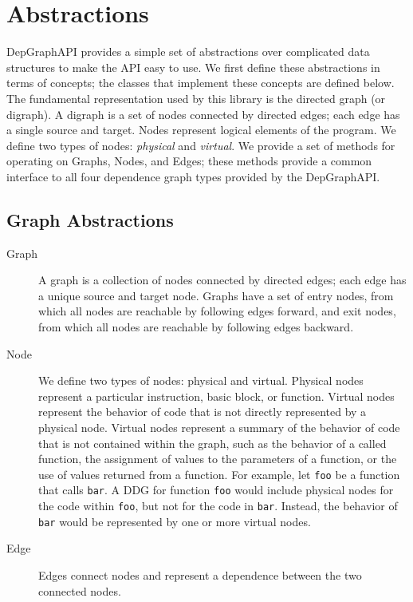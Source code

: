 \documentclass[12pt,titlepage]{article}
\begin{document}
\section{Abstractions}

DepGraphAPI provides a simple set of abstractions over complicated
data structures to make the API easy to use. We first define these
abstractions in terms of concepts; the classes that implement these
concepts are defined below. The fundamental representation used by
this library is the directed graph (or digraph). A digraph is a set of
nodes connected by directed edges; each edge has a single source and
target. Nodes represent logical elements of the program. We define two
types of nodes: \emph{physical} and \emph{virtual}.  We provide a set
of methods for operating on Graphs, Nodes, and Edges; these methods
provide a common interface to all four dependence graph types provided
by the DepGraphAPI.

\subsection{Graph Abstractions}
\begin{description}
\item[Graph] A graph is a collection of nodes connected by directed
  edges; each edge has a unique source and target node. Graphs have a
  set of entry nodes, from which all nodes are reachable by following
  edges forward, and exit nodes, from which all nodes are reachable by
  following edges backward.
\item[Node] We define two types of nodes: physical and
  virtual. Physical nodes represent a particular instruction, basic
  block, or function. Virtual nodes represent the behavior of code
  that is not directly represented by a physical node. Virtual nodes
  represent a summary of the behavior of code that is not contained
  within the graph, such as the behavior of a called function, the
  assignment of values to the parameters of a function, or the use of
  values returned from a function. For example, let \texttt{foo} be a
  function that calls \texttt{bar}. A DDG for function \texttt{foo}
  would include physical nodes for the code within \texttt{foo}, but
  not for the code in \texttt{bar}. Instead, the behavior of
  \texttt{bar} would be represented by one or more virtual nodes.
\item[Edge] Edges connect nodes and represent a dependence between the
  two connected nodes.
\end{description}
\end{document}
